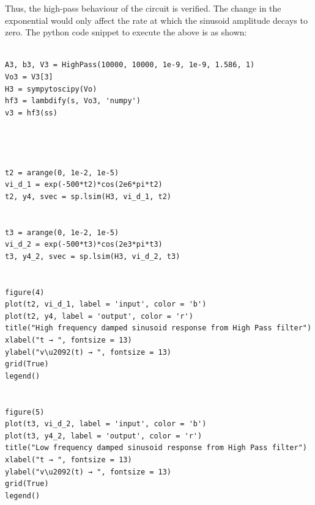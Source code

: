 \documentclass[11pt, a4paper]{article}
\begin{document}
   Thus, the high-pass behaviour of the circuit is verified.  The change in the exponential would only affect the rate at which the sinusoid amplitude decays to zero.
The python code snippet to execute the above is as shown:
\begin{verbatim}
    
A3, b3, V3 = HighPass(10000, 10000, 1e-9, 1e-9, 1.586, 1)
Vo3 = V3[3]
H3 = sympytoscipy(Vo)
hf3 = lambdify(s, Vo3, 'numpy')
v3 = hf3(ss)




t2 = arange(0, 1e-2, 1e-5) 
vi_d_1 = exp(-500*t2)*cos(2e6*pi*t2)
t2, y4, svec = sp.lsim(H3, vi_d_1, t2)


t3 = arange(0, 1e-2, 1e-5)    
vi_d_2 = exp(-500*t3)*cos(2e3*pi*t3)
t3, y4_2, svec = sp.lsim(H3, vi_d_2, t3)


figure(4)
plot(t2, vi_d_1, label = 'input', color = 'b')
plot(t2, y4, label = 'output', color = 'r')
title("High frequency damped sinusoid response from High Pass filter")
xlabel("t → ", fontsize = 13)
ylabel("v\u2092(t) → ", fontsize = 13)
grid(True)
legend()


figure(5)
plot(t3, vi_d_2, label = 'input', color = 'b')
plot(t3, y4_2, label = 'output', color = 'r')
title("Low frequency damped sinusoid response from High Pass filter")
xlabel("t → ", fontsize = 13)
ylabel("v\u2092(t) → ", fontsize = 13)
grid(True)
legend()
\end{verbatim}

\end{document}

